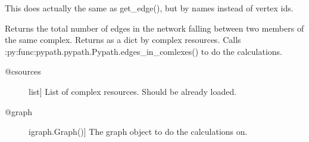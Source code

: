 \documentclass[letterpaper,10pt,english]{sphinxmanual}
\begin{document}
\begin{fulllineitems}
\begin{fulllineitems}
\label{\detokenize{main:pypath.main.PyPath.sources_venn_data}}
\end{fulllineitems}


\begin{fulllineitems}
\label{\detokenize{main:pypath.main.PyPath.straight_between}}
This does actually the same as get\_edge(), but by names
instead of vertex ids.

\end{fulllineitems}


\begin{fulllineitems}
\label{\detokenize{main:pypath.main.PyPath.string_effects}}
\end{fulllineitems}


\begin{fulllineitems}
\label{\detokenize{main:pypath.main.PyPath.sum_in_complex}}
Returns the total number of edges in the network falling
between two members of the same complex.
Returns as a dict by complex resources.
Calls :py:func:pypath.pypath.Pypath.edges\_in\_comlexes()
to do the calculations.
\begin{description}
\item[{@csources}] \leavevmode{[}list{]}
List of complex resources. Should be already loaded.

\item[{@graph}] \leavevmode{[}igraph.Graph(){]}
The graph object to do the calculations on.

\end{description}

\end{fulllineitems}



\end{fulllineitems}
\end{document}

